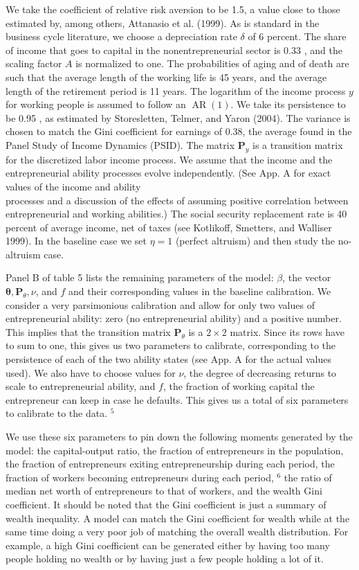 \documentclass[10pt]{article}
\begin{document}
We take the coefficient of relative risk aversion to be 1.5, a value close to those estimated by, among others, Attanasio et al. (1999). As is standard in the business cycle literature, we choose a depreciation rate $\delta$ of 6 percent. The share of income that goes to capital in the nonentrepreneurial sector is 0.33 , and the scaling factor $A$ is normalized to one. The probabilities of aging and of death are such that the average length of the working life is 45 years, and the average length of the retirement period is 11 years. The logarithm of the income process $y$ for working people is assumed to follow an $\operatorname{AR}(1)$. We take its persistence to be 0.95 , as estimated by Storesletten, Telmer, and Yaron (2004). The variance is chosen to match the Gini coefficient for earnings of 0.38, the average found in the Panel Study of Income Dynamics (PSID). The matrix $\mathbf{P}_{y}$ is a transition matrix for the discretized labor income process. We assume that the income and the entrepreneurial ability processes evolve independently. (See App. A for exact values of the income and ability\\
processes and a discussion of the effects of assuming positive correlation between entrepreneurial and working abilities.) The social security replacement rate is 40 percent of average income, net of taxes (see Kotlikoff, Smetters, and Walliser 1999). In the baseline case we set $\eta=1$ (perfect altruism) and then study the no-altruism case.

Panel B of table 5 lists the remaining parameters of the model: $\beta$, the vector $\boldsymbol{\theta}, \mathbf{P}_{\theta}, \nu$, and $f$ and their corresponding values in the baseline calibration. We consider a very parsimonious calibration and allow for only two values of entrepreneurial ability: zero (no entrepreneurial ability) and a positive number. This implies that the transition matrix $\mathbf{P}_{\theta}$ is a $2 \times 2$ matrix. Since its rows have to sum to one, this gives us two parameters to calibrate, corresponding to the persistence of each of the two ability states (see App. A for the actual values used). We also have to choose values for $\nu$, the degree of decreasing returns to scale to entrepreneurial ability, and $f$, the fraction of working capital the entrepreneur can keep in case he defaults. This gives us a total of six parameters to calibrate to the data. ${ }^{5}$

We use these six parameters to pin down the following moments generated by the model: the capital-output ratio, the fraction of entrepreneurs in the population, the fraction of entrepreneurs exiting entrepreneurship during each period, the fraction of workers becoming entrepreneurs during each period, ${ }^{6}$ the ratio of median net worth of entrepreneurs to that of workers, and the wealth Gini coefficient. It should be noted that the Gini coefficient is just a summary of wealth inequality. A model can match the Gini coefficient for wealth while at the same time doing a very poor job of matching the overall wealth distribution. For example, a high Gini coefficient can be generated either by having too many people holding no wealth or by having just a few people holding a lot of it.
\end{document}
